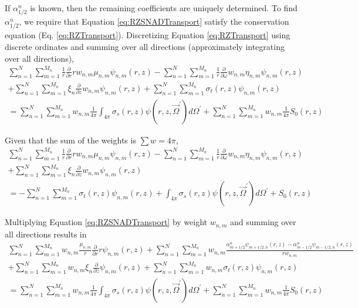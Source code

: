\documentclass[12pt]{article}
\begin{document}
\noindent If $\alpha_{1/2}^n$ is known, then the remaining coefficients are uniquely determined. To find $\alpha_{1/2}^n$, we require that Equation \ref{eq:RZSNADTransport} satisfy the conservation equation (Eq. \ref{eq:RZTransport}).
%
\iffalse
Discretizing Equation \ref{eq:RZTransport} using discrete ordinates and summing over all directions (approximately integrating over all directions),
\begin{multline}
\sum_{n=1}^N \sum_{m=1}^{M_n} \frac{1}{r} \frac{\partial}{\partial r} r w_{n,m} \mu_{n,m} \psi_{n,m} \left(r,z \right) - \sum_{n=1}^N \sum_{m=1}^{M_n} \frac{1}{r} \frac{\partial}{\partial \omega} w_{n,m} \eta_{n,m} \psi_{n,m} \left(r,z \right) \\
+ \sum_{n=1}^N \sum_{m=1}^{M_n} \xi_n \frac{\partial}{\partial z} w_{n,m} \psi_{n,m} \left(r,z \right) + \sum_{n=1}^N \sum_{m=1}^{M_n} \sigma_t \left(r,z \right) \psi_{n,m} \left(r,z \right) \\
= \sum_{n=1}^N \sum_{m=1}^{M_n} w_{n,m} \frac{1}{4 \pi} \int_{4 \pi} \sigma_s \left(r,z \right) \psi \left(r,z, \vec{\Omega}^\prime \right) d \Omega^\prime + \sum_{n=1}^N \sum_{m=1}^{M_n} w_{n,m} \frac{1}{4 \pi} S_0 \left(r,z \right)
\end{multline}

\noindent Given that the sum of the weights is $\sum w = 4 \pi$,
\begin{multline}
\sum_{n=1}^N \sum_{m=1}^{M_n} \frac{1}{r} \frac{\partial}{\partial r} r w_{n,m} \mu_{n,m} \psi_{n,m} \left(r,z \right) - \sum_{n=1}^N \sum_{m=1}^{M_n} \frac{1}{r} \frac{\partial}{\partial \omega} w_{n,m} \eta_{n,m} \psi_{n,m} \left(r,z \right) \\
+ \sum_{n=1}^N \sum_{m=1}^{M_n} \xi_n \frac{\partial}{\partial z} w_{n,m} \psi_{n,m} \left(r,z \right) \\
= - \sum_{n=1}^N \sum_{m=1}^{M_n} \sigma_t \left(r,z \right) \psi_{n,m} \left(r,z \right) + \int_{4 \pi} \sigma_s \left(r,z \right) \psi \left(r,z, \vec{\Omega}^\prime \right) d \Omega^\prime +  S_0 \left(r,z \right)
\end{multline}

\noindent Multiplying Equation \ref{eq:RZSNADTransport} by weight $w_{n,m}$ and summing over all directions results in
\begin{multline}
\sum_{n=1}^N \sum_{m=1}^{M_n} w_{n,m} \frac{\mu_{n,m}}{r} \frac{\partial}{\partial r} r \psi_{n,m} \left(r,z \right) + \sum_{n=1}^N \sum_{m=1}^{M_n} w_{n,m} \frac{\alpha_{m+1/2}^n \psi_{m+1/2,n} (r,z) - \alpha_{m-1/2}^n \psi_{m-1/2,n} (r,z)}{r w_{n,m}} \\
+ \sum_{n=1}^N \sum_{m=1}^{M_n} w_{n,m} \xi_n \frac{\partial}{\partial z} \psi_{n,m} \left(r,z \right) + \sum_{n=1}^N \sum_{m=1}^{M_n} w_{n,m} \sigma_t \left(r,z \right) \psi_{n,m} \left(r,z \right) \\
= \sum_{n=1}^N \sum_{m=1}^{M_n} w_{n,m} \frac{1}{4 \pi} \int_{4 \pi} \sigma_s \left(r,z \right) \psi \left(r,z, \vec{\Omega}^\prime \right) d \Omega^\prime + \sum_{n=1}^N \sum_{m=1}^{M_n} w_{n,m} \frac{1}{4 \pi} S_0 \left(r,z \right)
\end{multline}
\end{document}
